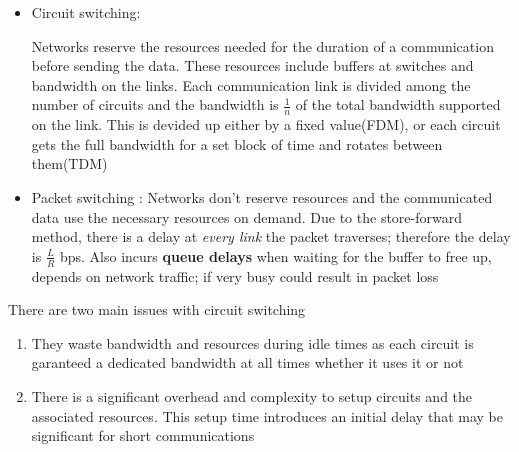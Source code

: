\documentclass[12pt] {report}
\begin{document}
\begin{itemize}
\item Circuit switching:

Networks reserve the resources needed for the duration of a communication before sending the data. These resources include buffers at switches and bandwidth on the links. Each communication link is divided among the number of circuits and the bandwidth is \textbf{$\frac{1}{n}$} of the total bandwidth supported on the link. This is devided up either by a fixed value(FDM), or each circuit gets the full bandwidth for a set block of time and rotates between them(TDM)
\item Packet switching :
    Networks don't reserve resources and the communicated data use the necessary resources on demand. Due to the store-forward method, there is a delay at \textit{every link} the packet traverses; therefore the delay is $\frac{L}{R}$ bps. Also incurs \textbf{queue delays} when waiting for the buffer to free up, depends on network traffic; if very busy could result in packet loss
    \end{itemize}
    \nt
{
    There are two main issues with circuit switching
    \begin{enumerate}
    \item They waste bandwidth and resources during idle times as each circuit is garanteed a dedicated bandwidth at all times whether it uses it or not

    \item There is a significant overhead and complexity to setup circuits and the associated resources. This setup time introduces an initial delay that may be significant for short communications
    \end{enumerate}

}
\end{document}
